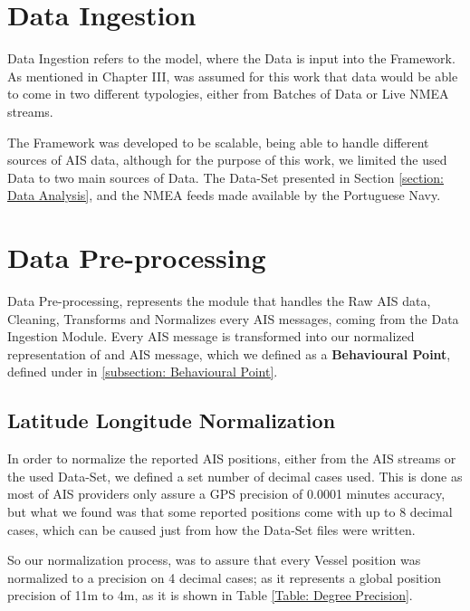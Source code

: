 \section{Data Ingestion}
\todo[inline]{}
Data Ingestion refers to the model, where the Data is input into the Framework. As mentioned in Chapter III, was assumed for this work that data would be able to come in two different typologies, either from Batches of Data or Live NMEA streams. 

The Framework was developed to be scalable, being able to handle different sources of AIS data, although for the purpose of this work, we limited the used Data to two main sources of Data. The Data-Set presented in Section \ref{section: Data Analysis}, and the NMEA feeds made available by the Portuguese Navy.




\section{Data Pre-processing}
Data Pre-processing, represents the module that handles the Raw AIS data, Cleaning, Transforms and Normalizes every AIS messages, coming from the Data Ingestion Module. Every AIS message is transformed into our normalized representation of and AIS message, which we defined as a \textbf{Behavioural Point}, defined under in \ref{subsection: Behavioural Point}.

\subsection{Latitude Longitude Normalization}
In order to normalize the reported AIS positions, either from the AIS streams or the used Data-Set, we defined a set number of decimal cases used. This is done as most of AIS providers only assure a GPS precision of 0.0001 minutes accuracy, but what we found was that some reported positions come with up to 8 decimal cases, which can be caused just from how the Data-Set files were written.

So our normalization process, was to assure that every Vessel position was normalized to a precision on 4 decimal cases; as it represents a global position precision of 11m to 4m, as it is shown in Table \ref{Table: Degree Precision}.

